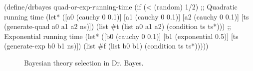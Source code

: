 \begin{lrbox}{\codebox}
\begin{varwidth}[b]{\textwidth}
\def\oldcodesize{\codesize}
\def\codesize{\small}
\begin{center}\singlespacing
\begin{schemedisplay}
(define/drbayes quad-or-exp-running-time
  (if (< (random) 1/2)
      ;; Quadratic running time
      (let* ([a0  (cauchy 0 0.1)]
             [a1  (cauchy 0 0.1)]
             [a2  (cauchy 0 0.1)]
             [ts  (generate-quad a0 a1 a2 ns)])
        (list #t (list a0 a1 a2)
              (condition ts ts*)))
      ;; Exponential running time
      (let* ([b0  (cauchy 0 0.1)]
             [b1  (exponential 0.5)]
             [ts  (generate-exp b0 b1 ns)])
        (list #f (list b0 b1)
              (condition ts ts*)))))
\end{schemedisplay}
\end{center}
\def\codesize{\oldcodesize}
\end{varwidth}
\end{lrbox}


\begin{figure}[tb!]\centering
{}
\tab
{}
\caption[Bayesian theory selection in Dr. Bayes]{Bayesian theory selection in Dr. Bayes.}
\label{fig:model-selection}
\end{figure}

